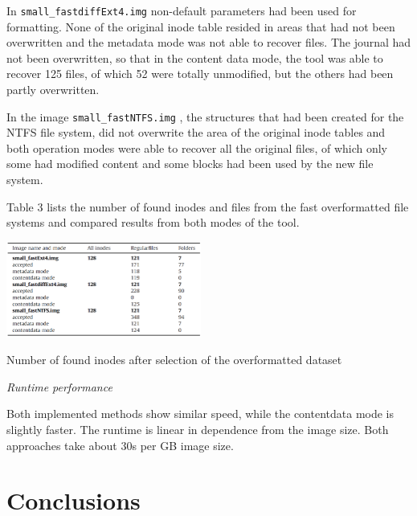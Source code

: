 \documentclass{acm_proc_article-sp}
\begin{document}
In \texttt{small\_fastdiffExt4.img} non-default parameters had been used 
 for formatting. None of the original inode table resided in areas that had not been overwritten and the metadata mode was not able to recover files. The journal had not been overwritten, so that in the content data mode, the tool was able to recover 125 files, of which 52 were totally unmodified, but the others had been partly overwritten.

In the image 
\texttt{small\_fastNTFS.img}
, the structures that had been created for the NTFS file system, did not overwrite the area of the original inode tables and both operation modes were able to recover all the original files, of which only some had modified content and some blocks had been used by the new file system.

Table 3 lists the number of found inodes and files from the fast overformatted file systems and compared results from both modes of the tool.

\begin{table}
\centering
\includegraphics[width=0.48\textwidth]{images/number.png}
	\caption{Number of found inodes after selection of the overformatted dataset}
\end{table}

\textit{Runtime performance}

Both implemented methods show similar speed, while the contentdata mode is slightly faster. The runtime is linear in dependence from the image size. Both approaches take about 30s per GB image size.

\section{Conclusions}




\balancecolumns
\end{document}
